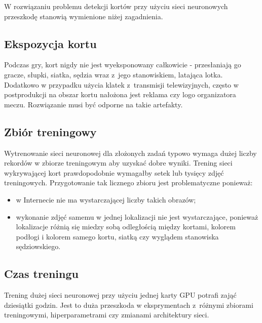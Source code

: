 W rozwiązaniu problemu detekcji kortów przy użyciu sieci neuronowych przeszkodę stanowią wymienione niżej zagadnienia.

\subsection*{Ekspozycja kortu}

Podczas gry, kort nigdy nie jest wyeksponowany całkowicie - przesłaniają go gracze, słupki, siatka, sędzia wraz z~jego stanowiskiem, latająca lotka.
Dodatkowo w przypadku użycia klatek z~transmisji telewizyjnych, często w postprodukcji na obszar kortu nałożona jest reklama czy logo organizatora meczu.
Rozwiązanie musi być odporne na takie artefakty.

\subsection*{Zbiór treningowy}

Wytrenowanie sieci neuronowej dla złożonych zadań typowo wymaga dużej liczby rekordów w zbiorze treningowym aby uzyskać dobre wyniki.
Trening sieci wykrywającej kort prawdopodobnie wymagałby setek lub tysięcy zdjęć treningowych.
Przygotowanie tak licznego zbioru jest problematyczne ponieważ:

\begin{itemize}
	\item w Internecie nie ma wystarczającej liczby takich obrazów;
	\item wykonanie zdjęć samemu w jednej lokalizacji nie jest wystarczające, ponieważ lokalizacje różnią się miedzy sobą odległością między kortami, kolorem podłogi i kolorem samego kortu, siatką czy wyglądem stanowiska sędziowskiego.
\end{itemize}

\subsection*{Czas treningu}

Trening dużej sieci neuronowej przy użyciu jednej karty GPU potrafi zająć dziesiątki godzin.
Jest to duża przeszkoda w eksprymentach z~różnymi zbiorami treningowymi, hiperparametrami czy zmianami architektury sieci.
